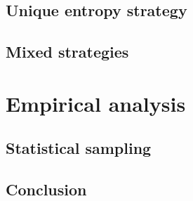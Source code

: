 \subsection{Unique entropy strategy}

\subsection{Mixed strategies}

\section{Empirical analysis}

\subsection{Statistical sampling}

\subsection{Conclusion}